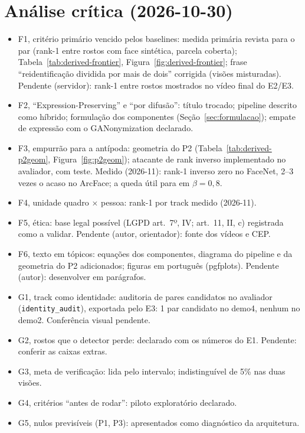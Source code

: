 \section{Análise crítica (2026-10-30)}
\begin{itemize}
\item F1, critério primário vencido pelos baselines: medida primária revista para o par (rank-1 entre rostos com face sintética, parcela coberta); Tabela~\ref{tab:derived-frontier}, Figura~\ref{fig:derived-frontier}; frase ``reidentificação dividida por mais de dois'' corrigida (visões misturadas). Pendente (servidor): rank-1 entre rostos mostrados no vídeo final do E2/E3.
\item F2, ``Expression-Preserving'' e ``por difusão'': título trocado; pipeline descrito como híbrido; formulação dos componentes (Seção~\ref{sec:formulacao}); empate de expressão com o GANonymization declarado.
\item F3, empurrão para a antípoda: geometria do P2 (Tabela~\ref{tab:derived-p2geom}, Figura~\ref{fig:p2geom}); atacante de rank inverso implementado no avaliador, com teste. Medido (2026-11): rank-1 inverso zero no FaceNet, 2--3 vezes o acaso no ArcFace; a queda útil para em $\beta = 0{,}8$.
\item F4, unidade quadro $\times$ pessoa: rank-1 por track medido (2026-11).
\item F5, ética: base legal possível (LGPD art.~7º, IV; art.~11, II, c) registrada como a validar. Pendente (autor, orientador): fonte dos vídeos e CEP.
\item F6, texto em tópicos: equações dos componentes, diagrama do pipeline e da geometria do P2 adicionados; figuras em português (pgfplots). Pendente (autor): desenvolver em parágrafos.
\item G1, track como identidade: auditoria de pares candidatos no avaliador (\texttt{identity\_audit}), exportada pelo E3: 1 par candidato no demo4, nenhum no demo2. Conferência visual pendente.
\item G2, rostos que o detector perde: declarado com os números do E1. Pendente: conferir as caixas extras.
\item G3, meta de verificação: lida pelo intervalo; indistinguível de 5\% nas duas visões.
\item G4, critérios ``antes de rodar'': piloto exploratório declarado.
\item G5, nulos previsíveis (P1, P3): apresentados como diagnóstico da arquitetura.

\end{itemize}
